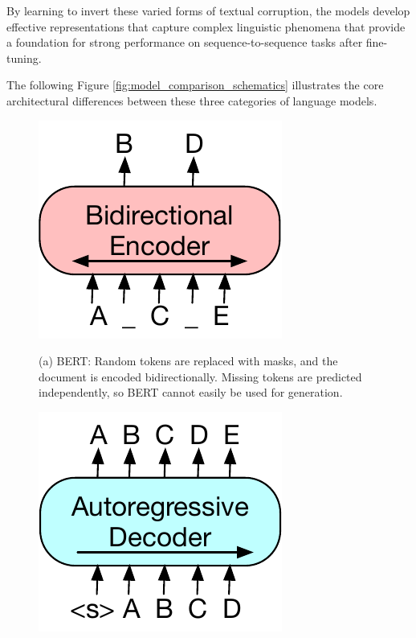 By learning to invert these varied forms of textual corruption, the models develop effective representations that capture complex linguistic phenomena that provide a foundation for strong performance on sequence-to-sequence tasks after fine-tuning.


The following Figure \ref{fig:model_comparison_schematics} illustrates the core architectural differences between these three categories of language models.

\begin{figure}[ht!]
    \centering

    \begin{minipage}[t]{0.48\textwidth}
        \centering
        \includegraphics[width=0.7\linewidth]{obrazky-figures/lm_archs/bert.pdf}
        \vspace{0.5em} %
        \parbox{\linewidth}{\small %
        (a) BERT: Random tokens are replaced with masks, and the document is encoded bidirectionally. Missing tokens are predicted independently, so BERT cannot easily be used for generation.
        }
    \end{minipage}
    \hfill %
    \begin{minipage}[t]{0.48\textwidth}
        \centering
        \includegraphics[width=0.7\linewidth]{obrazky-figures/lm_archs/gpt.pdf}

\end{minipage}
\end{figure}
